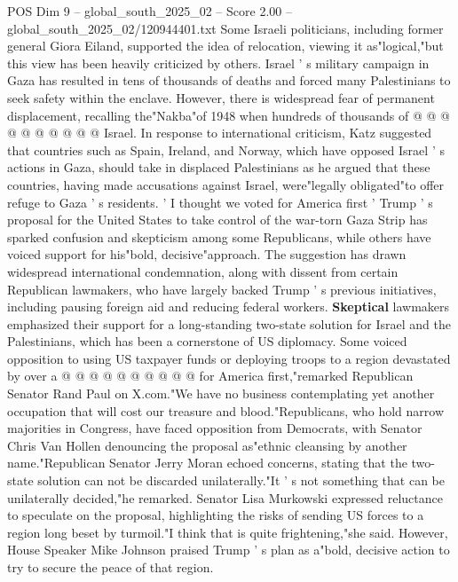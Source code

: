 \begin{textsample}{POS Dim 9 – global\_south\_2025\_02 – Score 2.00 – global\_south\_2025\_02/120944401.txt}
Some Israeli politicians, including former general Giora Eiland, supported the idea of relocation, viewing it as"logical,"but this view has been heavily criticized by others.
Israel ' s military campaign in Gaza has resulted in tens of thousands of deaths and forced many Palestinians to seek safety within the enclave.
However, there is widespread fear of permanent displacement, recalling the"Nakba"of 1948 when hundreds of thousands of @ @ @ @ @ @ @ @ @ @ Israel.
In response to international criticism, Katz suggested that countries such as Spain, Ireland, and Norway, which have opposed Israel ' s actions in Gaza, should take in displaced Palestinians as he argued that these countries, having made accusations against Israel, were"legally obligated"to offer refuge to Gaza ' s residents. ' I thought we voted for America first ' Trump ' s proposal for the United States to take control of the war-torn Gaza Strip has sparked confusion and skepticism among some Republicans, while others have voiced support for his"bold, decisive"approach.
The suggestion has drawn widespread international condemnation, along with dissent from certain Republican lawmakers, who have largely backed Trump ' s previous initiatives, including pausing foreign aid and reducing federal workers. \textbf{Skeptical} lawmakers emphasized their support for a long-standing two-state solution for Israel and the Palestinians, which has been a cornerstone of US diplomacy.
Some voiced opposition to using US taxpayer funds or deploying troops to a region devastated by over a @ @ @ @ @ @ @ @ @ @ for America first,"remarked Republican Senator Rand Paul on X.com."We have no business contemplating yet another occupation that will cost our treasure and blood."Republicans, who hold narrow majorities in Congress, have faced opposition from Democrats, with Senator Chris Van Hollen denouncing the proposal as"ethnic cleansing by another name."Republican Senator Jerry Moran echoed concerns, stating that the two-state solution can not be discarded unilaterally."It ' s not something that can be unilaterally decided,"he remarked.
Senator Lisa Murkowski expressed reluctance to speculate on the proposal, highlighting the risks of sending US forces to a region long beset by turmoil."I think that is quite frightening,"she said.
However, House Speaker Mike Johnson praised Trump ' s plan as a"bold, decisive action to try to secure the peace of that region.

\end{textsample}
